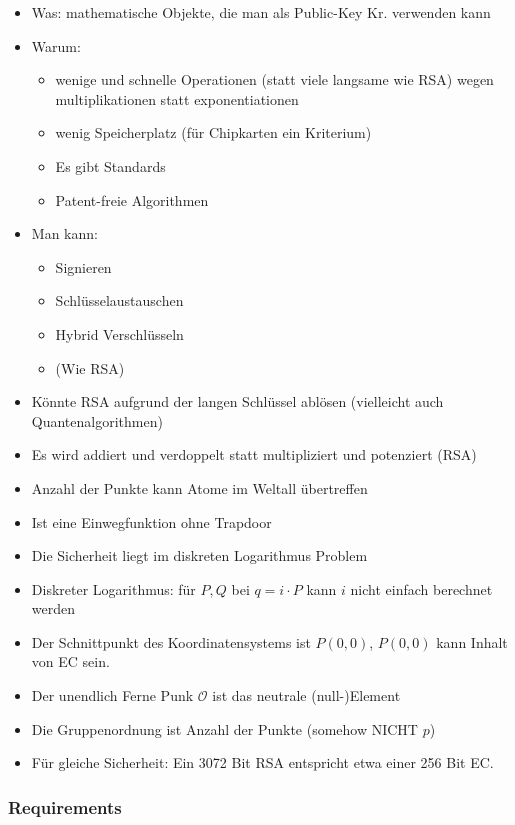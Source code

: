 \documentclass[12pt]{scrartcl}
\begin{document}
\begin{itemize}
    \item Was: mathematische Objekte, die man als Public-Key Kr. verwenden kann
    \item Warum:
    \begin{itemize}
        \item wenige und schnelle Operationen (statt viele langsame wie RSA) wegen 
        multiplikationen statt exponentiationen 
        \item wenig Speicherplatz (für Chipkarten ein Kriterium)
        \item Es gibt Standards
        \item Patent-freie Algorithmen
    \end{itemize}
    \item Man kann:
    \begin{itemize}
        \item Signieren
        \item Schlüsselaustauschen
        \item Hybrid Verschlüsseln
        \item (Wie RSA)
    \end{itemize}
    \item Könnte RSA aufgrund der langen Schlüssel ablösen (vielleicht auch Quantenalgorithmen)
    \item Es wird addiert und verdoppelt statt multipliziert und potenziert (RSA)
    \item Anzahl der Punkte kann Atome im Weltall übertreffen
    \item Ist eine Einwegfunktion ohne Trapdoor
    \item Die Sicherheit liegt im diskreten Logarithmus Problem
    \item Diskreter Logarithmus: für $P,Q$ bei $q = i \cdot P$ kann $i$ nicht einfach berechnet werden
    \item Der Schnittpunkt des Koordinatensystems ist $P(0,0)$, $P(0,0)$ kann Inhalt von EC sein.
    \item Der unendlich Ferne Punk $\mathcal{O}$ ist das neutrale (null-)Element
    \item Die Gruppenordnung ist Anzahl der Punkte (somehow NICHT $p$)
    \item Für gleiche Sicherheit: Ein 3072 Bit RSA entspricht etwa einer 256 Bit EC.
\end{itemize}


\newpage
\subsubsection{Requirements}
\end{document}
